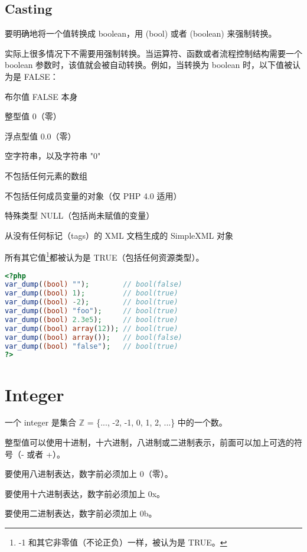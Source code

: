 \subsection{Casting}


要明确地将一个值转换成 boolean，用 (bool) 或者 (boolean) 来强制转换。

实际上很多情况下不需要用强制转换。当运算符、函数或者流程控制结构需要一个 boolean 参数时，该值就会被自动转换。例如，当转换为 boolean 时，以下值被认为是 FALSE：

\begin{compactitem}
\item 布尔值 FALSE 本身
\item 整型值 0（零）
\item 浮点型值 0.0（零）
\item 空字符串，以及字符串 "0"
\item 不包括任何元素的数组
\item 不包括任何成员变量的对象（仅 PHP 4.0 适用）
\item 特殊类型 NULL（包括尚未赋值的变量）
\item 从没有任何标记（tags）的 XML 文档生成的 SimpleXML 对象
\end{compactitem}

所有其它值\footnote{-1 和其它非零值（不论正负）一样，被认为是 TRUE。}都被认为是 TRUE（包括任何资源类型）。


\begin{lstlisting}[language=PHP]
<?php
var_dump((bool) "");        // bool(false)
var_dump((bool) 1);         // bool(true)
var_dump((bool) -2);        // bool(true)
var_dump((bool) "foo");     // bool(true)
var_dump((bool) 2.3e5);     // bool(true)
var_dump((bool) array(12)); // bool(true)
var_dump((bool) array());   // bool(false)
var_dump((bool) "false");   // bool(true)
?>
\end{lstlisting}


\section{Integer}

一个 integer 是集合 $\mathbb{Z}$ = \{..., -2, -1, 0, 1, 2, ...\} 中的一个数。

整型值可以使用十进制，十六进制，八进制或二进制表示，前面可以加上可选的符号（- 或者 +）。

\begin{compactitem}
\item 要使用八进制表达，数字前必须加上 0（零）。
\item 要使用十六进制表达，数字前必须加上 0x。
\item 要使用二进制表达，数字前必须加上 0b。
\end{compactitem}



